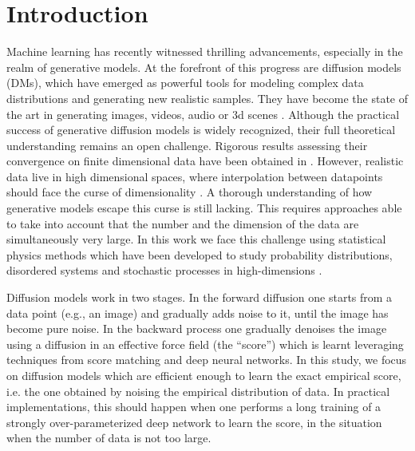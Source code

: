\documentclass[10pt,twocolumn]{article}
\begin{document}
\section*{Introduction}
Machine learning has recently witnessed thrilling advancements, especially in the realm of generative models. At the forefront of this progress are diffusion models (DMs), which have emerged as powerful tools for modeling complex data distributions and generating new realistic samples. They have become the state of the art in generating images, videos, audio or 3d scenes
{\cite{Sohl_Dickstein2015,Song2019,Song_Sohl-Dickstein2021,guth2022wavelet,yang2022diffusion,saharia2022photorealistic,bar2024lumiere,poole2022dreamfusion}}.  
Although the practical success of generative diffusion models is widely recognized, their full theoretical understanding remains an open challenge. 
Rigorous results assessing their convergence on finite dimensional data have been obtained in \cite{de2021diffusion,lee2022convergence,de2022convergence,benton2023linear,conforti2023score,chen2022sampling}. However,
realistic data live in high dimensional spaces, where interpolation
between datapoints should face the curse of dimensionality \cite{donoho2000high}. A thorough understanding of how generative models escape this curse is still lacking. This requires approaches able to take into account that the number and the dimension of the data are simultaneously very large. 
In this work we face this challenge using statistical physics methods which have been developed to study probability distributions, disordered systems and stochastic processes in high-dimensions \cite{mezard2009information, charbonneau2023spin,bonnaire2023high}.


Diffusion models work in two stages. In the forward diffusion one starts from a data point (e.g., an image) and gradually adds noise to it, until the image has become pure noise. In the backward process one gradually denoises the image using a diffusion in an effective force field (the ``score'')  which is learnt leveraging techniques from score matching \cite{hyvarinen2005estimation,vincent2011connection} and deep neural networks. In this study, we focus on diffusion models which are efficient enough to learn the exact empirical score, i.e. the one obtained by noising the empirical distribution of data. 
In practical implementations, this should happen when one performs a long training of a strongly over-parameterized deep network to learn the score, in the situation when the number of data is not too large.
\end{document}
